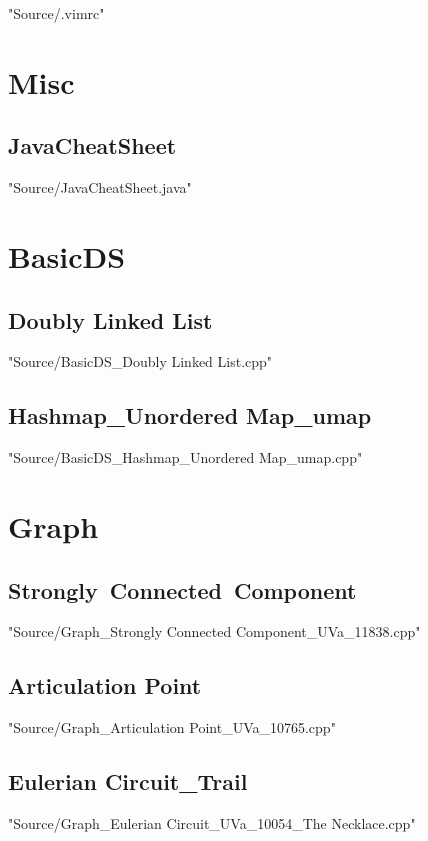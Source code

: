 \documentclass [12pt,twocolumn,oneside]{article}
\begin{document}
\pagestyle{fancy}
\fancyfoot{}
\fancyhead[R]{\thepage}
\renewcommand{\headrulewidth}{0.4pt}
\renewcommand{\contentsname}{Contents} 
\scriptsize
\tableofcontents

\bigskip
 {"Source/.vimrc"}

\newpage
\section{Misc}
\subsection{JavaCheatSheet}
 {"Source/JavaCheatSheet.java"}

\newpage
\section{BasicDS}
\subsection{Doubly Linked List}
 {"Source/BasicDS_Doubly Linked List.cpp"}
\subsection{Hashmap\_Unordered Map\_umap}
 {"Source/BasicDS_Hashmap_Unordered Map_umap.cpp"}

\newpage
\section{Graph}
\subsection{Strongly\ Connected\ Component}
 {"Source/Graph_Strongly Connected Component_UVa_11838.cpp"}
\subsection{Articulation Point}
 {"Source/Graph_Articulation Point_UVa_10765.cpp"}
\subsection{Eulerian Circuit\_Trail}
 {"Source/Graph_Eulerian Circuit_UVa_10054_The Necklace.cpp"}
\end{document}
